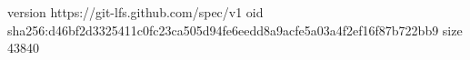 version https://git-lfs.github.com/spec/v1
oid sha256:d46bf2d3325411c0fc23ca505d94fe6eedd8a9acfe5a03a4f2ef16f87b722bb9
size 43840
